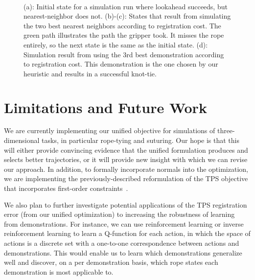\documentclass{article}
\begin{document}
\begin{figure}
\begin{subfigure}[b]{.24\textwidth}
\caption{}
\end{subfigure}\\
\caption{(a): Initial state for a simulation run where lookahead succeeds, but nearest-neighbor does not. (b)-(c): States that result from simulating the two best nearest neighbors according to registration cost. The green path illustrates the path the gripper took. It misses the rope entirely, so the next state is the same as the initial state. (d): Simulation result from using the 3rd best demonstration according to registration cost. This demonstration is the one chosen by our heuristic and results in a successful knot-tie.}
\label{fig:lookahead_results}
\end{figure}

\section{Limitations and Future Work}

We are currently implementing our unified objective for simulations of three-dimensional tasks, in particular rope-tying and suturing. Our hope is that this will either provide convincing evidence that the unified formulation produces and selects better trajectories, or it will provide new insight with which we can revise our approach. In addition, to formally incorporate normals into the optimization, we are implementing the previously-described reformulation of the TPS objective that incorporates first-order constraints~\cite{BooksteinGreen}.

We also plan to further investigate potential applications of the TPS registration error (from our unified optimization) to increasing the robustness of learning from demonstrations. For instance, we can use reinforcement learning or inverse reinforcement learning to learn a Q-function for each action, in which the space of actions is a discrete set with a one-to-one correspondence between actions and demonstrations. This would enable us to learn which demonstrations generalize well and discover, on a per demonstration basis, which rope states each demonstration is most applicable to.

\end{document}

